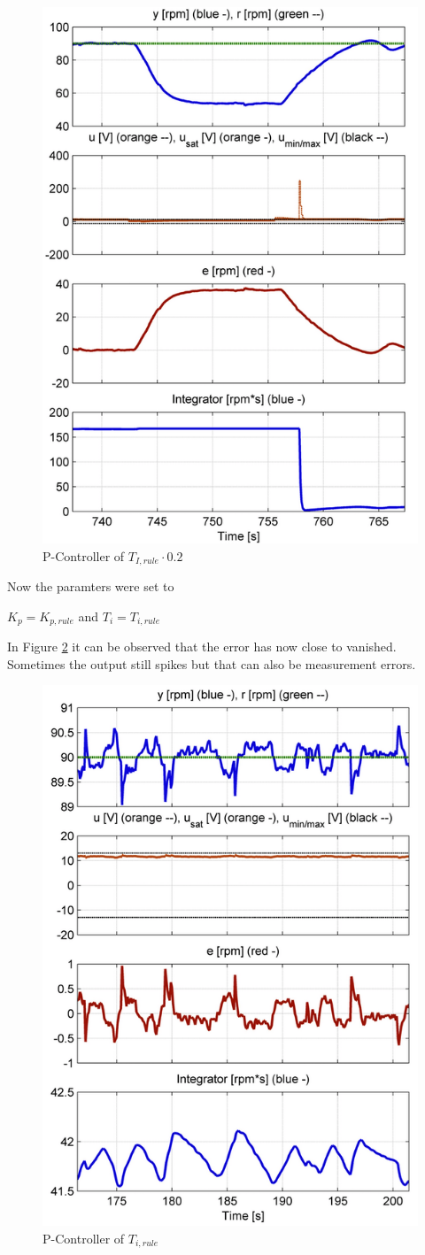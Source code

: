 \begin{figure}[H]
\begin{center}
\includegraphics[width=0.5\linewidth]{images/general/PI/PI_RiseTime02}
\end{center}
\caption{P-Controller of $ T_{I,rule}\cdot{0.2}$}
\label{fig:PI_RiseTime02}
\end{figure}

Now the paramters were set to

\begin{center}
{$K_{p}= K_{p,rule}$ and $T_{i}=T_{i,rule}$}
\end{center}

In Figure \ref{fig:PI_Controller1} it can be observed that the error has now close to vanished. Sometimes the output still spikes but that can also be measurement errors.

\begin{figure}[H]
\begin{center}
\includegraphics[width=0.5\linewidth]{images/general/PI/PI_Controller1}
\end{center}
\caption{P-Controller of $ T_{i,rule}$}
\label{fig:PI_Controller1}
\end{figure}

